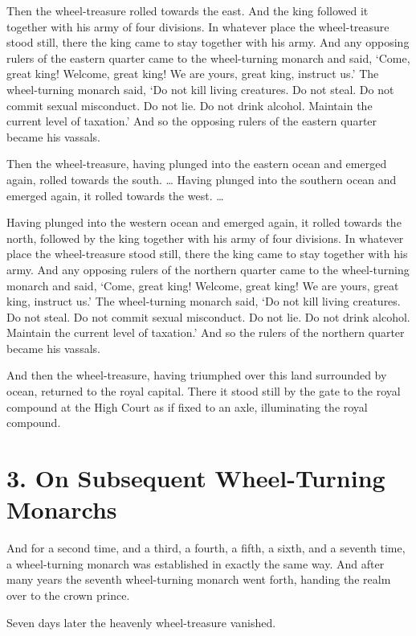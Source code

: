 \documentclass[12pt,openany]{book}%
\begin{document}
Then the wheel-treasure rolled towards the east. And the king followed it together with his army of four divisions. In whatever place the wheel-treasure stood still, there the king came to stay together with his army. And any opposing rulers of the eastern quarter came to the wheel-turning monarch and said, ‘Come, great king! Welcome, great king! We are yours, great king, instruct us.’ The wheel-turning monarch said, ‘Do not kill living creatures. Do not steal. Do not commit sexual misconduct. Do not lie. Do not drink alcohol. Maintain the current level of taxation.’ And so the opposing rulers of the eastern quarter became his vassals. 

Then the wheel-treasure, having plunged into the eastern ocean and emerged again, rolled towards the south. … Having plunged into the southern ocean and emerged again, it rolled towards the west. … 

Having plunged into the western ocean and emerged again, it rolled towards the north, followed by the king together with his army of four divisions. In whatever place the wheel-treasure stood still, there the king came to stay together with his army. And any opposing rulers of the northern quarter came to the wheel-turning monarch and said, ‘Come, great king! Welcome, great king! We are yours, great king, instruct us.’ The wheel-turning monarch said, ‘Do not kill living creatures. Do not steal. Do not commit sexual misconduct. Do not lie. Do not drink alcohol. Maintain the current level of taxation.’ And so the rulers of the northern quarter became his vassals. 

And then the wheel-treasure, having triumphed over this land surrounded by ocean, returned to the royal capital. There it stood still by the gate to the royal compound at the High Court as if fixed to an axle, illuminating the royal compound. 

\section*{3. On Subsequent Wheel-Turning Monarchs }

And for a second time, and a third, a fourth, a fifth, a sixth, and a seventh time, a wheel-turning monarch was established in exactly the same way. And after many years the seventh wheel-turning monarch went forth, handing the realm over to the crown prince. 

Seven days later the heavenly wheel-treasure vanished. 
\end{document}
